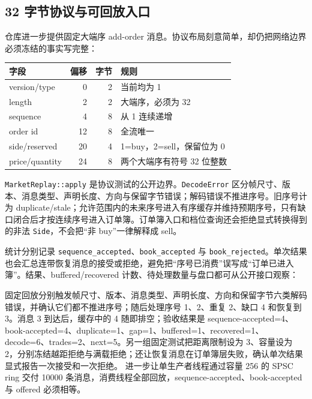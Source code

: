\subsection{32 字节协议与可回放入口}

仓库进一步提供固定大端序 add-order 消息。协议布局刻意简单，却仍把网络边界必须冻结的事实写完整：

\begin{center}
\small
\begin{tabular}{@{}lrrl@{}}
\toprule
字段 & 偏移 & 字节 & 规则 \\
\midrule
version/type & 0 & 2 & 当前均为 1 \\
length & 2 & 2 & 大端序，必须为 32 \\
sequence & 4 & 8 & 从 1 连续递增 \\
order id & 12 & 8 & 全流唯一 \\
side/reserved & 20 & 4 & 1=buy，2=sell，保留位为 0 \\
price/quantity & 24 & 8 & 两个大端序有符号 32 位整数 \\
\bottomrule
\end{tabular}
\end{center}

\texttt{MarketReplay::apply} 是协议测试的公开边界。\texttt{DecodeError} 区分帧尺寸、版本、消息类型、声明长度、方向与保留字节错误；解码错误不推进序号。旧序号计为 duplicate/stale；允许范围内的未来序号进入有序缓存并维持预期序号，只有缺口闭合后才按连续序号进入订单簿。订单簿入口和档位查询还会拒绝显式转换得到的非法 \texttt{Side}，不会把“非 buy”一律解释成 sell。

统计分别记录 \texttt{sequence\_accepted}、\texttt{book\_accepted} 与 \texttt{book\_rejected}。单次结果也会汇总连带恢复消息的接受或拒绝，避免把“序号已消费”误写成“订单已进入簿”。结果、buffered/recovered 计数、待处理数量与盘口都可从公开接口观察：





固定回放分别触发帧尺寸、版本、消息类型、声明长度、方向和保留字节六类解码错误，并确认它们都不推进序号；随后处理序号 1、2、重复 2、缺口 4 和恢复到 3。消息 3 到达后，缓存中的 4 随即排空；验收结果是 sequence-accepted=4、book-accepted=4、duplicate=1、gap=1、buffered=1、recovered=1、decode=6、trades=2、next=5。另一组固定测试把距离限制设为 3、容量设为 2，分别冻结越距拒绝与满载拒绝；还让恢复消息在订单簿层失败，确认单次结果显式报告一次接受和一次拒绝。 进一步让单生产者线程通过容量 256 的 SPSC ring 交付 10000 条消息，消费线程全部回放，sequence-accepted、book-accepted 与 offered 必须相等。

